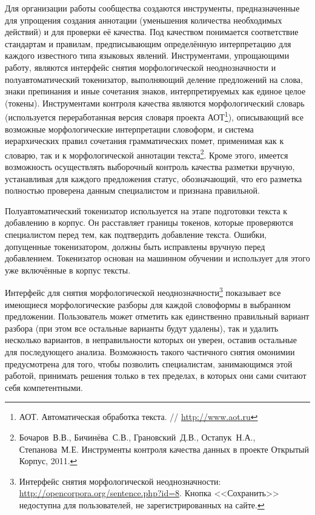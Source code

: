\documentclass[a4paper]{article}
\begin{document}
Для организации работы сообщества создаются инструменты, предназначенные для упрощения создания аннотации (уменьшения количества необходимых действий) и для проверки её качества. Под качеством понимается соответствие стандартам и правилам, предписывающим определённую интерпретацию для каждого известного типа языковых явлений. Инструментами, упрощающими работу, являются интерфейс снятия морфологической неоднозначности и полуавтоматический токенизатор, выполняющий деление предложений на слова, знаки препинания и иные сочетания знаков, интерпретируемых как единое целое (токены). Инструментами контроля качества являются морфологический словарь (используется переработанная версия словаря проекта АОТ\footnote{АОТ. Автоматическая обработка текста. // \url{http://www.aot.ru}}), описывающий все возможные морфологические интерпретации словоформ, и система иерархических правил сочетания грамматических помет, применимая как к словарю, так и к морфологической аннотации текста\footnote{Бочаров~В.В., Бичинёва~С.В., Грановский~Д.В., Остапук~Н.А., Степанова~М.Е. Инструменты контроля качества данных в проекте Открытый Корпус, 2011.}. Кроме этого, имеется возможность осуществлять выборочный контроль качества разметки вручную, устанавливая для каждого предложения статус, обозначающий, что его разметка полностью проверена данным специалистом и признана правильной.

Полуавтоматический токенизатор используется на этапе подготовки текста к добавлению в корпус. Он расставляет границы токенов, которые проверяются специалистом перед тем, как подтвердить добавление текста. Ошибки, допущенные токенизатором, должны быть исправлены вручную перед добавлением. Токенизатор основан на машинном обучении и использует для этого уже включённые в корпус тексты.

Интерфейс для снятия морфологической неоднозначности\footnote{Интерфейс снятия морфологической неоднозначности: \url{http://opencorpora.org/sentence.php?id=8}. Кнопка <<Сохранить>> недоступна для пользователей, не зарегистрированных на сайте.} показывает все имеющиеся морфологические разборы для каждой словоформы в выбранном предложении. Пользователь может отметить как единственно правильный вариант разбора (при этом все остальные варианты будут удалены), так и удалить несколько вариантов, в неправильности которых он уверен, оставив остальные для последующего анализа. Возможность такого частичного снятия омонимии предусмотрена для того, чтобы позволить специалистам, занимающимся этой работой, принимать решения только в тех пределах, в которых они сами считают себя компетентными.
\end{document}
